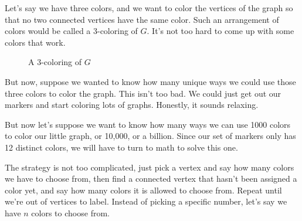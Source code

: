 \documentclass[12pt,oneside]{../../sfsuthesis}
\begin{document}
Let's say we have three colors, and we want to color the vertices of the graph so that no two connected vertices have the same color.
Such an arrangement of colors would be called a 3-coloring of \( G \).
It's not too hard to come up with some colors that work.

\begin{figure}[H]
    \centering
    \caption{A 3-coloring of \(G\)}
\end{figure}

But now, suppose we wanted to know how many unique ways we could use those three colors to color the graph.
This isn't too bad.
We could just get out our markers and start coloring lots of graphs.
Honestly, it sounds relaxing.

But now let's suppose we want to know how many ways we can use 1000 colors to color our little graph, or 10,000, or a billion.
Since our set of markers only has 12 distinct colors, we will have to turn to math to solve this one.

The strategy is not too complicated, just pick a vertex and say how many colors we have to choose from, then find a connected vertex that hasn't been assigned a color yet, and say how many colors it is allowed to choose from.
Repeat until we're out of vertices to label.
Instead of picking a specific number, let's say we have \( n \) colors to choose from.
\end{document}
